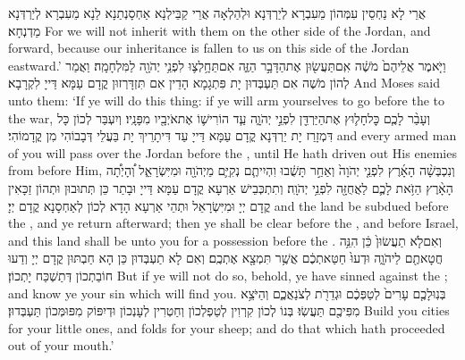 {אֲרֵי לָא נַחְסֵין עִמְּהוֹן מֵעִבְרָא לְיַרְדְּנָא וּלְהַלְאָה אֲרֵי קַבֵּילְנָא אַחְסָנְתַנָא לַנָא מֵעִבְרָא לְיַרְדְּנָא מַדְנְחָא׃}
{For we will not inherit with them on the other side of the Jordan, and forward, because our inheritance is fallen to us on this side of the Jordan eastward.’}{}
{וַיֹּ֤אמֶר אֲלֵיהֶם֙ מֹשֶׁ֔ה אִֽם\maqqaf תַּעֲשׂ֖וּן אֶת\maqqaf הַדָּבָ֣ר הַזֶּ֑ה אִם\maqqaf תֵּחָ֥לְצ֛וּ לִפְנֵ֥י יְהֹוָ֖ה לַמִּלְחָמָֽה׃}
{וַאֲמַר לְהוֹן מֹשֶׁה אִם תַּעְבְּדוּן יָת פִּתְגָמָא הָדֵין אִם תִּזְדָּרְזוּן קֳדָם עַמָּא דַּייָ לִקְרָבָא׃}
{And Moses said unto them: ‘If ye will do this thing: if ye will arm yourselves to go before the \lord\space to the war,}{}
{וְעָבַ֨ר לָכֶ֧ם כׇּל\maqqaf חָל֛וּץ אֶת\maqqaf הַיַּרְדֵּ֖ן לִפְנֵ֣י יְהֹוָ֑ה עַ֧ד הוֹרִישׁ֛וֹ אֶת\maqqaf אֹיְבָ֖יו מִפָּנָֽיו׃}
{וְיִעְבַּר לְכוֹן כָּל דִּמְזָרַז יָת יַרְדְּנָא קֳדָם עַמָּא דַּייָ עַד דִּיתָרֵיךְ יָת בַּעֲלֵי דְּבָבוֹהִי מִן קֳדָמוֹהִי׃}
{and every armed man of you will pass over the Jordan before the \lord, until He hath driven out His enemies from before Him,}{}
{וְנִכְבְּשָׁ֨ה הָאָ֜רֶץ לִפְנֵ֤י יְהֹוָה֙ וְאַחַ֣ר תָּשֻׁ֔בוּ וִהְיִיתֶ֧ם נְקִיִּ֛ם מֵיְהֹוָ֖ה וּמִיִּשְׂרָאֵ֑ל וְ֠הָיְתָ֠ה הָאָ֨רֶץ הַזֹּ֥את לָכֶ֛ם לַאֲחֻזָּ֖ה לִפְנֵ֥י יְהֹוָֽה׃}
{וְתִתְכְּבֵישׁ אַרְעָא קֳדָם עַמָּא דַּייָ וּבָתַר כֵּן תְּתוּבוּן וּתְהוֹן זַכָּאִין קֳדָם יְיָ וּמִיִּשְׂרָאֵל וּתְהֵי אַרְעָא הָדָא לְכוֹן לְאַחְסָנָא קֳדָם יְיָ׃}
{and the land be subdued before the \lord, and ye return afterward; then ye shall be clear before the \lord, and before Israel, and this land shall be unto you for a possession before the \lord.}{}
{וְאִם\maqqaf לֹ֤א תַעֲשׂוּן֙ כֵּ֔ן הִנֵּ֥ה חֲטָאתֶ֖ם לַיהֹוָ֑ה וּדְעוּ֙ חַטַּאתְכֶ֔ם אֲשֶׁ֥ר תִּמְצָ֖א אֶתְכֶֽם׃}
{וְאִם לָא תַעְבְּדוּן כֵּן הָא חַבְתּוּן קֳדָם יְיָ וְדַעוּ חוֹבַתְכוֹן דְּתַשְׁכַּח יָתְכוֹן׃}
{But if ye will not do so, behold, ye have sinned against the \lord; and know ye your sin which will find you.}{}
{בְּנֽוּ\maqqaf לָכֶ֤ם עָרִים֙ לְטַפְּכֶ֔ם וּגְדֵרֹ֖ת לְצֹנַאֲכֶ֑ם וְהַיֹּצֵ֥א מִפִּיכֶ֖ם תַּעֲשֽׂוּ׃}
{בְּנוֹ לְכוֹן קִרְוִין לְטַפְלְכוֹן וְחַטְרִין לְעָנְכוֹן וּדְיִפּוֹק מִפּוּמְּכוֹן תַּעְבְּדוּן׃}
{Build you cities for your little ones, and folds for your sheep; and do that which hath proceeded out of your mouth.’}{}
